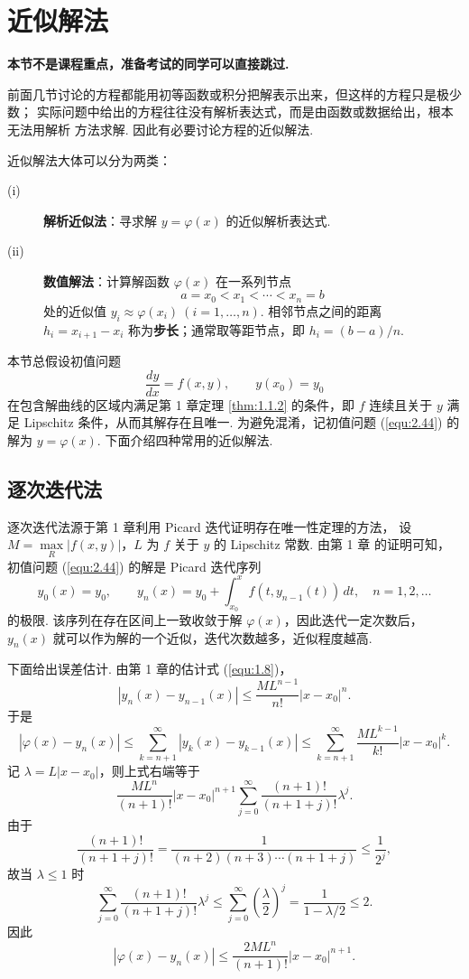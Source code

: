 \section{近似解法}\label{sec:2.6}
\textbf{本节不是课程重点，准备考试的同学可以直接跳过.}


前面几节讨论的方程都能用初等函数或积分把解表示出来，但这样的方程只是极少数；
实际问题中给出的方程往往没有解析表达式，而是由函数或数据给出，根本无法用解析
方法求解. 因此有必要讨论方程的近似解法.

近似解法大体可以分为两类：
\begin{description}
\item[(i)] \textbf{解析近似法}：寻求解 $y=\varphi(x)$ 的近似解析表达式.
\item[(ii)] \textbf{数值解法}：计算解函数 $\varphi(x)$ 在一系列节点
\[
a=x_0<x_1<\cdots<x_n=b
\]
处的近似值 $y_i\approx\varphi(x_i)\ (i=1,\ldots,n)$. 相邻节点之间的距离
$h_i=x_{i+1}-x_i$ 称为\textbf{步长}；通常取等距节点，即 $h_i=(b-a)/n$.
\end{description}

本节总假设初值问题
\begin{equation}\label{equ:2.44}
\frac{dy}{dx}=f(x,y),\qquad y(x_0)=y_0
\end{equation}
在包含解曲线的区域内满足第 1 章定理 \ref{thm:1.1.2} 的条件，即 $f$ 连续且关于
$y$ 满足 Lipschitz 条件，从而其解存在且唯一. 为避免混淆，记初值问题 (\ref{equ:2.44})
的解为 $y=\varphi(x)$. 下面介绍四种常用的近似解法.

\subsection{逐次迭代法}
逐次迭代法源于第 1 章利用 Picard 迭代证明存在唯一性定理的方法，
设 $M=\max\limits_{R}|f(x,y)|$，$L$ 为 $f$ 关于 $y$ 的 Lipschitz 常数. 由第 1 章
的证明可知，初值问题 (\ref{equ:2.44}) 的解是 Picard 迭代序列
\begin{equation}\label{equ:2.45}
y_0(x)=y_0,\qquad
y_n(x)=y_0+\int_{x_0}^{x}f(t,y_{n-1}(t))\,dt,\quad n=1,2,\ldots
\end{equation}
的极限. 该序列在存在区间上一致收敛于解 $\varphi(x)$，因此迭代一定次数后，$y_n(x)$
就可以作为解的一个近似，迭代次数越多，近似程度越高.

下面给出误差估计. 由第 1 章的估计式 (\ref{equ:1.8})，
\[
|y_n(x)-y_{n-1}(x)|\le\frac{ML^{n-1}}{n!}|x-x_0|^n .
\]
于是
\begin{equation}\label{equ:2.46}
|\varphi(x)-y_n(x)|\le\sum_{k=n+1}^{\infty}|y_k(x)-y_{k-1}(x)|
\le\sum_{k=n+1}^{\infty}\frac{ML^{k-1}}{k!}|x-x_0|^k .
\end{equation}
记 $\lambda=L|x-x_0|$，则上式右端等于
\[
\frac{ML^n}{(n+1)!}|x-x_0|^{n+1}
\sum_{j=0}^{\infty}\frac{(n+1)!}{(n+1+j)!}\lambda^j .
\]
由于
\[
\frac{(n+1)!}{(n+1+j)!}
=\frac{1}{(n+2)(n+3)\cdots(n+1+j)}\le\frac{1}{2^j},
\]
故当 $\lambda\le1$ 时
\[
\sum_{j=0}^{\infty}\frac{(n+1)!}{(n+1+j)!}\lambda^j
\le\sum_{j=0}^{\infty}\left(\frac{\lambda}{2}\right)^j
=\frac{1}{1-\lambda/2}\le2 .
\]
因此
\begin{equation}\label{equ:2.47}
|\varphi(x)-y_n(x)|\le\frac{2ML^n}{(n+1)!}|x-x_0|^{n+1}.
\end{equation}

